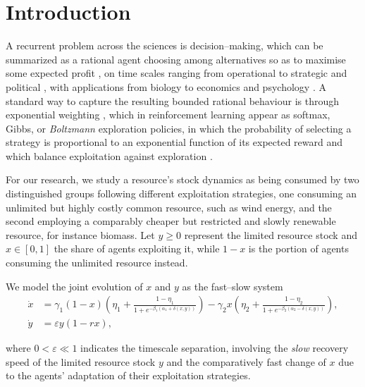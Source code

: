 \documentclass[3p]{elsarticle}
\theoremstyle{plain}
\theoremstyle{remark}
\theoremstyle{definition}
\begin{document}
 

\section{Introduction}\label{Sec:Introduction}
A recurrent problem across the sciences is decision--making, which can be summarized as a rational agent
choosing among alternatives so as to maximise some expected profit
\cite{Ref:Kelly2003, Ref:Peterson2009}, on time scales ranging from operational to
strategic and political \cite{Ref:Marugan2015, Ref:GarciaMarquez2022}, with
applications from biology \cite{Ref:Helikar2008, Ref:Balazsi2011} to economics
\cite{Ref:Lynn2015} and psychology \cite{Ref:Mishra2014}. A standard way to
capture the resulting bounded rational behaviour is through exponential weighting
\cite{Ref:Arora2012}, which in reinforcement learning \cite{Ref:Sutton2018, Ref:Wang2020}
appear as softmax, Gibbs, or \emph{Boltzmann} exploration policies, in which
the probability of selecting a strategy is proportional to an exponential function
of its expected reward and which balance exploitation against exploration
\cite{Ref:Bianchi2017}.

    For our research, we study a resource's stock dynamics as being consumed by two distinguished groups following different exploitation strategies, one consuming an unlimited but highly costly common resource, such as wind energy, and the second employing a comparably cheaper but restricted and slowly renewable resource, for instance biomass. Let $y \geq 0$ represent the limited resource stock and $x \in[0,1]$ the share of agents exploiting it, while $1-x$ is the portion of agents consuming the unlimited resource instead. 
    
    We model the joint evolution of $x$ and $y$ as the fast--slow system
    \begin{subequations}
    \renewcommand{\theequation}{\theparentequation.\arabic{equation}}
        \begin{align}
            \dot{x} &= \gamma_{1}(1-x)\left( \eta_{1} + \frac{1-\eta_{1}}{1+e^{-\beta_{1}(\alpha_{1} + \delta(x,y))}} \right) - \gamma_{2} x \left( \eta_{2} + \frac{1-\eta_{2}}{1+e^{-\beta_{2}(\alpha_{2} - \delta(x,y))}} \right), \label{Eq:FastComponentOriginalSystem}\\
            \dot{y} &= \varepsilon y (1-rx), \label{Eq:SlowComponentOriginalSystem}
        \end{align}
        \label{Eq:OriginalSystem}
    \end{subequations}\par
    \noindent where $0<\varepsilon\ll1$ indicates the timescale separation, involving the \emph{slow} recovery speed of the limited resource stock $y$ and the comparatively fast change of $x$ due to the agents' adaptation of their exploitation strategies. 
    
\end{document}
